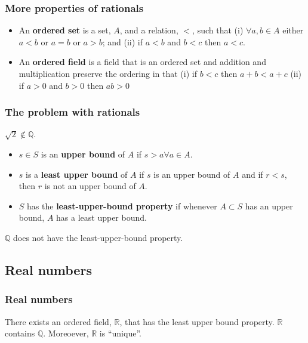 \documentclass[compress]{beamer}
\begin{document}
\begin{frame}
  \frametitle{More properties of rationals}
  \begin{itemize}
  \item An \textbf{ordered set} is a set, $A$, and a relation, $<$,
    such that (i) $\forall a,b \in A$ either $a < b$ or $a = b$ or $a
    > b$; and (ii) if $a < b$ and $b < c$ then $a < c$.
  \item An \textbf{ordered field} is a field that is an ordered set
    and addition and multiplication preserve the ordering in that (i)
    if $b<c$ then $a + b < a + c$ (ii) if $a>0$ and $b>0$ then $ab>0$
  \end{itemize}
\end{frame}

\begin{frame}
  \frametitle{The problem with rationals}
  \begin{theorem}
    $\sqrt{2} \not\in \mathbb{Q}$.
  \end{theorem}
  \begin{itemize}
  \item $s \in S$ is an \textbf{upper bound} of $A$ if $s > a \forall
    a \in A$.
  \item $s$ is a \textbf{least upper bound} of $A$ if $s$ is an upper
    bound of $A$ and if $r < s$, then $r$ is not an upper bound of
    $A$. 
  \item $S$ has the \textbf{least-upper-bound property} if whenever $A
    \subset S$ has an upper bound, $A$ has a least upper bound.
  \end{itemize}
  \begin{theorem}
    $\mathbb{Q}$ does not have the least-upper-bound property.
  \end{theorem}
\end{frame}

\subsection{Real numbers}
\begin{frame}
  \frametitle{Real numbers}
  \begin{theorem}
    There exists an ordered field, $\mathbb{R}$, that has the least
    upper bound property. $\mathbb{R}$ contains $\mathbb{Q}$. Moreoever,
    $\mathbb{R}$ is ``unique''.
  \end{theorem}
\end{frame}
\end{document}
